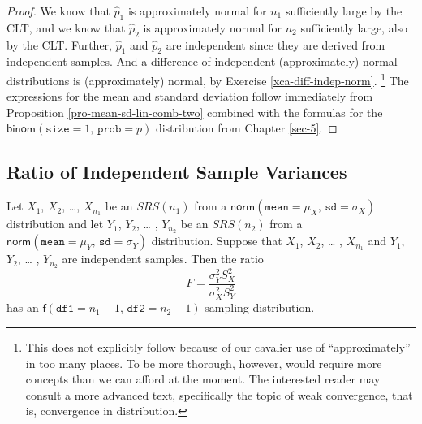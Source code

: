 \documentclass[captions=tableheading]{scrbook}
\begin{document}
\begin{proof}
We know that \(\hat{p}_{1}\) is approximately normal for \(n_{1}\) sufficiently large by the CLT, and we know that \(\hat{p}_{2}\) is approximately normal for \(n_{2}\) sufficiently large, also by the CLT. Further, \(\hat{p}_{1}\) and \(\hat{p}_{2}\) are independent since they are derived from independent samples. And a difference of independent (approximately) normal distributions is (approximately) normal, by Exercise \ref{xca-diff-indep-norm}.
\footnote{This does not explicitly follow because of our cavalier use of ``approximately'' in too many places. To be more thorough, however, would require more concepts than we can afford at the moment. The interested reader may consult a more advanced text, specifically the topic of weak convergence, that is, convergence in distribution.}
The expressions for the mean and standard deviation follow immediately from Proposition \ref{pro-mean-sd-lin-comb-two} combined with the formulas for the \(\mathsf{binom}(\mathtt{size}=1,\,\mathtt{prob}=p)\) distribution from Chapter \ref{sec-5}.
\end{proof}
\subsection{Ratio of Independent Sample Variances}
\label{sec-8-4-3}


\begin{prop}
Let \(X_{1}\), \(X_{2}\), \ldots{}, \(X_{n_{1}}\) be an \(SRS(n_{1})\) from a \(\mathsf{norm}(\mathtt{mean}=\mu_{X},\,\mathtt{sd}=\sigma_{X})\) distribution and let \(Y_{1}\), \(Y_{2}\), \ldots{} , \(Y_{n_{2}}\) be an \(SRS(n_{2})\) from a \(\mathsf{norm}(\mathtt{mean}=\mu_{Y},\,\mathtt{sd}=\sigma_{Y})\) distribution. Suppose that \(X_{1}\), \(X_{2}\), \ldots{} , \(X_{n_{1}}\) and \(Y_{1}\), \(Y_{2}\), \ldots{} , \(Y_{n_{2}}\) are independent samples. Then the ratio
\begin{equation}
F=\frac{\sigma_{Y}^{2}S_{X}^{2}}{\sigma_{X}^{2}S_{Y}^{2}}
\end{equation}
has an \(\mathsf{f}(\mathtt{df1}=n_{1}-1,\,\mathtt{df2}=n_{2}-1)\) sampling distribution.
\end{prop}
\end{document}
